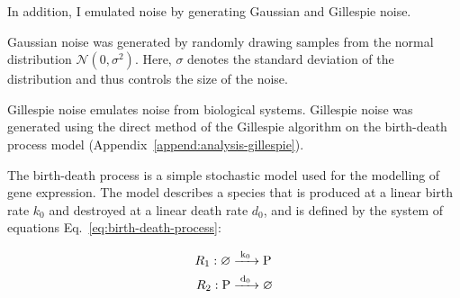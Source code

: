 \pagebreak

In addition, I emulated noise by generating Gaussian and Gillespie noise.

Gaussian noise was generated by randomly drawing samples from the normal distribution $\mathcal{N}(0,\sigma^{2})$.
Here, $\sigma$ denotes the standard deviation of the distribution and thus controls the size of the noise.



Gillespie noise emulates noise from biological systems.
Gillespie noise was generated using the direct method of the Gillespie algorithm \parencite{gillespieExactStochasticSimulation1977} on the birth-death process model (Appendix~\ref{append:analysis-gillespie}).

The birth-death process is a simple stochastic model used for the modelling of gene expression.
The model describes a species that is produced at a linear birth rate $k_{0}$ and destroyed at a linear death rate $d_{0}$, and is defined by the system of equations Eq.\ \ref{eq:birth-death-process}:

\begin{equation}
  \begin{aligned}
    R_{1}: \varnothing \ce{ &->[k_{0}] P}\\
    R_{2}: \ce{P &->[d_{0}]} \varnothing
  \end{aligned}
  \label{eq:birth-death-process}
\end{equation}

